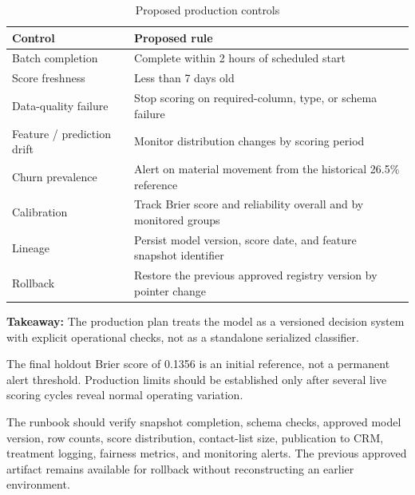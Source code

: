 \documentclass[11pt]{article}
\newcommand{\takeaway}[1]{\vspace{1pt}\noindent\textbf{Takeaway:} #1\vspace{3pt}}
\begin{document}
\begin{table}[H]
\centering\small
\caption{Proposed production controls}
\begin{tabularx}{\textwidth}{p{}Y}
\toprule
Control & Proposed rule \\
\midrule
Batch completion & Complete within 2 hours of scheduled start \\
Score freshness & Less than 7 days old \\
Data-quality failure & Stop scoring on required-column, type, or schema failure \\
Feature / prediction drift & Monitor distribution changes by scoring period \\
Churn prevalence & Alert on material movement from the historical 26.5\% reference \\
Calibration & Track Brier score and reliability overall and by monitored groups \\
Lineage & Persist model version, score date, and feature snapshot identifier \\
Rollback & Restore the previous approved registry version by pointer change \\
\bottomrule
\end{tabularx}
\end{table}
\takeaway{The production plan treats the model as a versioned decision system with explicit operational checks, not as a standalone serialized classifier.}

The final holdout Brier score of 0.1356 is an initial reference, not a permanent alert threshold. Production limits should be established only after several live scoring cycles reveal normal operating variation.

The runbook should verify snapshot completion, schema checks, approved model version, row counts, score distribution, contact-list size, publication to CRM, treatment logging, fairness metrics, and monitoring alerts. The previous approved artifact remains available for rollback without reconstructing an earlier environment.
\end{document}
